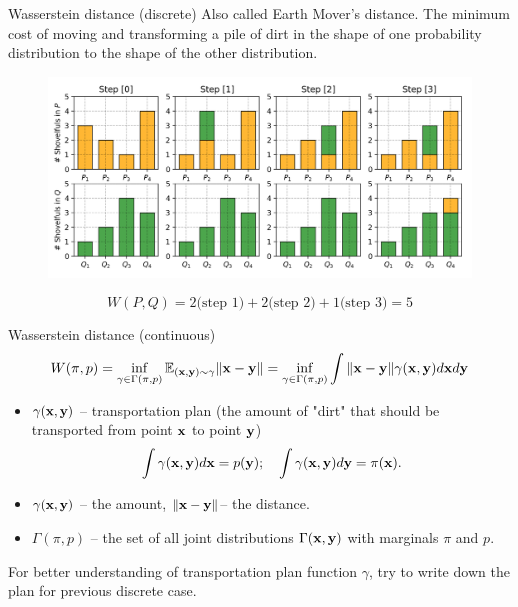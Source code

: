 \begin{frame}{Wasserstein distance (discrete)}
	Also called Earth Mover's distance.
	The minimum cost of moving and transforming a pile of dirt in the shape of one probability distribution to the shape of the other distribution.
	\begin{figure}
		\centering
		\includegraphics[width=.9\linewidth]{figs/EM_distance_discrete}
	\end{figure}
	\[
		W(P, Q) = 2 \text{(step 1)} + 2 \text{(step 2)} + 1 \text{(step 3)}  = 5
	\]
	
\end{frame}
\begin{frame}{Wasserstein distance (continuous)}
	\[
		W(\pi, p) = \inf_{\gamma \in \Gamma(\pi, p)} \mathbb{E}_{(\mathbf{x}, \mathbf{y}) \sim \gamma} \| \mathbf{x} - \mathbf{y} \| =  \inf_{\gamma \in \Gamma(\pi, p)} \int \| \mathbf{x} - \mathbf{y} \| \gamma (\mathbf{x}, \mathbf{y}) d \mathbf{x} d \mathbf{y}
	\]
	\begin{itemize}
		\item $\gamma(\mathbf{x}, \mathbf{y})$ -- transportation plan (the amount of "dirt" that should be transported from point $\mathbf{x}$ to point $\mathbf{y}$)
		\[
			 \int \gamma(\mathbf{x}, \mathbf{y}) d \mathbf{x} = p(\mathbf{y}); \quad \int \gamma(\mathbf{x}, \mathbf{y}) d \mathbf{y} = \pi(\mathbf{x}).
		\]
		\item $\gamma(\mathbf{x}, \mathbf{y})$ -- the amount, $\|\mathbf{x} - \mathbf{y} \|$-- the distance.
		\item $\Gamma(\pi, p)$ -- the set of all joint distributions $\Gamma (\mathbf{x}, \mathbf{y})$ with marginals $\pi$ and $p$.
	\end{itemize}
	For better understanding of transportation plan function $\gamma$, try to write down the plan for previous discrete case.
\end{frame}
